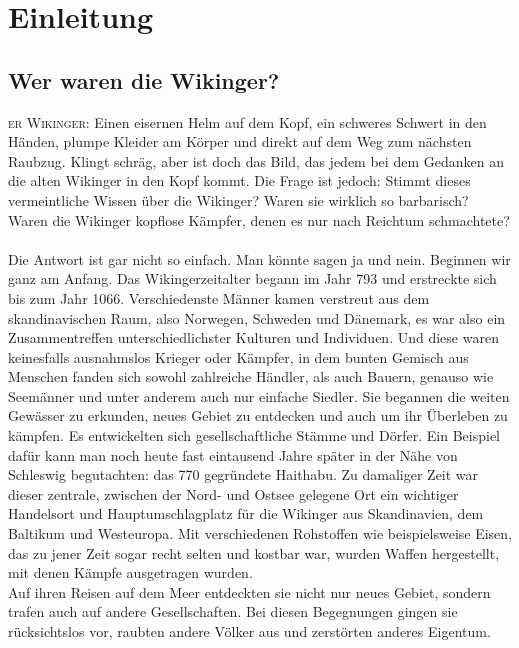 \documentclass[12pt,a4paper,ngerman,openany]{book}
\newcommand{\flettrine}[2]{\lettrine[lines=2, depth=0, loversize=0.25, nindent=0.69pt, lraise=0.15]{\initfamily{#1}}{#2}}
\newcommand*\initfamily{\usefont{U}{GotIn}{xl}{n}}
\newcommand\blankpage{\null \thispagestyle{empty} \addtocounter{page}{-1} \newpage}
\newcommand{\fchapter}[1]{\chapter{#1}\thispagestyle{chapterstyle}}
\begin{document}

\thispagestyle{empty}
\newpage

\afterpage{\blankpage}
\tableofcontents
\thispagestyle{empty}


\fchapter{Einleitung}

\section{Wer waren die Wikinger?}

\flettrine{D}{er Wikinger:} Einen eisernen Helm auf dem Kopf, ein schweres Schwert in den Händen, plumpe Kleider am Körper und direkt auf dem Weg zum nächsten Raubzug.
Klingt schräg, aber ist doch das Bild, das jedem bei dem Gedanken an die alten Wikinger in den Kopf kommt. Die Frage ist jedoch: Stimmt dieses vermeintliche Wissen über die Wikinger?
Waren sie wirklich so barbarisch? Waren die Wikinger kopflose Kämpfer, denen es nur nach Reichtum schmachtete?\\\\
Die Antwort ist gar nicht so einfach. Man könnte sagen ja und nein. Beginnen wir ganz am Anfang. Das Wikingerzeitalter begann im Jahr 793 und erstreckte sich bis zum Jahr 1066.
Verschiedenste Männer kamen verstreut aus dem skandinavischen Raum, also Norwegen, Schweden und Dänemark, es war also ein Zusammentreffen unterschiedlichster Kulturen und Individuen.
Und diese waren keinesfalls ausnahmslos Krieger oder Kämpfer, in dem bunten Gemisch aus Menschen fanden sich sowohl zahlreiche Händler, als auch Bauern, genauso wie Seemänner und unter anderem auch nur einfache Siedler.
Sie begannen die weiten Gewässer zu erkunden, neues Gebiet zu entdecken und auch um ihr Überleben zu kämpfen. Es entwickelten sich gesellschaftliche Stämme und Dörfer.
Ein Beispiel dafür kann man noch heute fast eintausend Jahre später in der Nähe von Schleswig begutachten: das 770 gegründete Haithabu. Zu damaliger Zeit war dieser zentrale,
zwischen der Nord- und Ostsee gelegene Ort ein wichtiger Handelsort und Hauptumschlagplatz für die Wikinger aus Skandinavien, dem Baltikum und Westeuropa. Mit verschiedenen Rohstoffen wie beispielsweise Eisen,
das zu jener Zeit sogar recht selten und kostbar war, wurden Waffen hergestellt, mit denen Kämpfe ausgetragen wurden.\\ 
Auf ihren Reisen auf dem Meer entdeckten sie nicht nur neues Gebiet, sondern trafen auch auf andere Gesellschaften. Bei diesen Begegnungen gingen sie rücksichtslos vor, raubten andere Völker aus und zerstörten anderes Eigentum.
\end{document}
